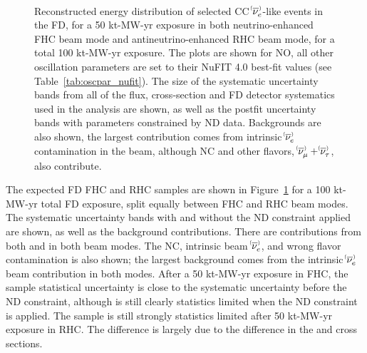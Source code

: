 \begin{figure}[htbp]
 \\
 \caption{Reconstructed energy distribution of selected CC $\nue^{\bracketbar}$-like events in the FD, for a 50 kt-MW-yr exposure in both neutrino-enhanced FHC beam mode and antineutrino-enhanced RHC beam mode, for a total 100 kt-MW-yr exposure. The plots are shown for NO, all other oscillation parameters are set to their NuFIT 4.0 best-fit values (see Table~\ref{tab:oscpar_nufit}). The size of the systematic uncertainty bands from all of the flux, cross-section and FD detector systematics used in the analysis are shown, as well as the postfit uncertainty bands with parameters constrained by ND data. Backgrounds are also shown, the largest contribution comes from intrinsic $\nue^{\bracketbar}$ contamination in the beam, although NC and other flavors, $\numu^{\bracketbar} + \nutau^{\bracketbar}$, also contribute.}
 \label{fig:appspectra}
\end{figure}
The expected FD FHC \nue and RHC \anue samples are shown in Figure~\ref{fig:appspectra} for a 100 kt-MW-yr total FD exposure, split equally between FHC and RHC beam modes. The systematic uncertainty bands with and without the ND constraint applied are shown, as well as the background contributions. There are contributions from both \nue and \anue in both beam modes. The NC, intrinsic beam $\nue^{\bracketbar}$, and wrong flavor contamination is also shown; the largest background comes from the intrinsic $\nue^{\bracketbar}$ beam contribution in both modes. After a 50 kt-MW-yr exposure in FHC, the \nue sample statistical uncertainty is close to the systematic uncertainty before the ND constraint, although is still clearly statistics limited when the ND constraint is applied. The \anue sample is still strongly statistics limited after 50 kt-MW-yr exposure in RHC. The difference is largely due to the difference in the \nue and \anue cross sections. %


